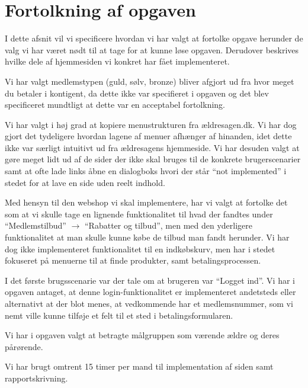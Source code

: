 \section{Fortolkning af opgaven}

I dette afsnit vil vi specificere hvordan vi har valgt at fortolke opgave
herunder de valg vi har været nødt til at tage for at kunne løse opgaven.
Derudover beskrives hvilke dele af hjemmesiden vi konkret har fået
implementeret.

Vi har valgt medlemstypen (guld, sølv, bronze) bliver afgjort ud fra hvor meget
du betaler i kontigent, da dette ikke var specifieret i opgaven og det blev
specificeret mundtligt at dette var en acceptabel fortolkning.

Vi har valgt i høj grad at kopiere menustrukturen fra ældresagen.dk. Vi har
dog gjort det tydeligere hvordan lagene af menuer afhænger af hinanden, idet
dette ikke var særligt intuitivt ud fra ældresagens hjemmeside. Vi har desuden
valgt at gøre meget lidt ud af de sider der ikke skal bruges til de konkrete
brugerscenarier samt at ofte lade links åbne en dialogboks hvori der står
``not implemented'' i stedet for at lave en side uden reelt indhold.

Med hensyn til den webshop vi skal implementere, har vi valgt at fortolke det
som at vi skulle tage en lignende funktionalitet til hvad der fandtes under
``Medlemstilbud'' $\rightarrow$ ``Rabatter og tilbud'', men med den yderligere
funktionalitet at man skulle kunne købe de tilbud man fandt herunder. Vi har dog
ikke implementeret funktionalitet til en indkøbskurv, men har i stedet fokuseret
på menuerne til at finde produkter, samt betalingsprocessen.

I det første brugsscenarie var der tale om at brugeren var ``Logget ind''. Vi
har i opgaven antaget, at denne login-funktionalitet er implementeret andetsteds
eller alternativt at der blot menes, at vedkommende har et medlemsnummer, som vi
nemt ville kunne tilføje et felt til et sted i betalingsformularen.

Vi har i opgaven valgt at betragte målgruppen som værende ældre og deres
pårørende.

Vi har brugt omtrent 15 timer per mand til implementation af siden samt
rapportskrivning.

